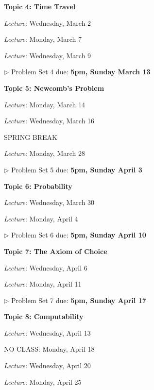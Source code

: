 \documentclass[11pt, a4paper]{article}
\begin{document}
\begin{center}\begin{minipage}{3.5 in}
\begin{flushleft}

\item[\textbf{Topic 4: Time Travel}]
\item

\emph{Lecture}: Wednesday, March 2

\emph{Lecture}: Monday, March 7

\emph{Lecture}: Wednesday, March 9

$\triangleright$ Problem Set 4 due: \textbf{5pm, Sunday March 13}

\item[\textbf{Topic 5: Newcomb's Problem}]

\item

\emph{Lecture}: Monday, March 14

\emph{Lecture}: Wednesday, March 16

SPRING BREAK

\emph{Lecture}: Monday, March 28

$\triangleright$ Problem Set 5 due: \textbf{5pm, Sunday April 3}

\item[\textbf{Topic 6: Probability}]
\item

\emph{Lecture}: Wednesday, March 30

\emph{Lecture}: Monday, April 4

$\triangleright$ Problem Set 6 due: \textbf{5pm, Sunday April 10}

\item[\textbf{Topic 7: The Axiom of Choice}]
\item

\emph{Lecture}: Wednesday, April 6

\emph{Lecture}: Monday, April 11

$\triangleright$ Problem Set 7 due: \textbf{5pm, Sunday April 17}

\item[\textbf{Topic 8: Computability}]

\item

\emph{Lecture}: Wednesday, April 13

NO CLASS: Monday, April 18

\emph{Lecture}: Wednesday, April 20

\emph{Lecture}: Monday, April 25


\end{flushleft}
\end{minipage}
\end{center}
\end{document}
